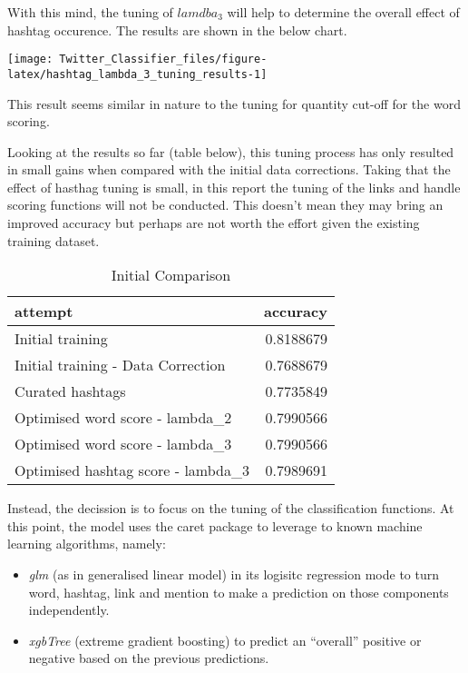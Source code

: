 \documentclass[11pt,]{article}
\providecommand{\tightlist}{%
  \setlength{\itemsep}{0pt}\setlength{\parskip}{0pt}}
\begin{document}
With this mind, the tuning of \(lamdba_3\) will help to determine the
overall effect of hashtag occurence. The results are shown in the below
chart.

\begin{center}\texttt{[image: Twitter\_Classifier\_files/figure-latex/hashtag\_lambda\_3\_tuning\_results-1]} \end{center}

This result seems similar in nature to the tuning for quantity cut-off
for the word scoring.

Looking at the results so far (table below), this tuning process has
only resulted in small gains when compared with the initial data
corrections. Taking that the effect of hasthag tuning is small, in this
report the tuning of the links and handle scoring functions will not be
conducted. This doesn't mean they may bring an improved accuracy but
perhaps are not worth the effort given the existing training dataset.

\begin{table}[H]

\caption{\label{tab:results_comparison_2}Initial Comparison}
\centering
\begin{tabular}[t]{lr}
\toprule
attempt & accuracy\\
\midrule
\rowcolor{gray!6}  Initial training & 0.8188679\\
Initial training - Data Correction & 0.7688679\\
\rowcolor{gray!6}  Curated hashtags & 0.7735849\\
Optimised word score - lambda\_2 & 0.7990566\\
\rowcolor{gray!6}  Optimised word score - lambda\_3 & 0.7990566\\
\addlinespace
Optimised hashtag score - lambda\_3 & 0.7989691\\
\bottomrule
\end{tabular}
\end{table}

Instead, the decission is to focus on the tuning of the classification
functions. At this point, the model uses the caret package to leverage
to known machine learning algorithms, namely:

\begin{itemize}
\tightlist
\item
  \emph{glm} (as in generalised linear model) in its logisitc regression
  mode to turn word, hashtag, link and mention to make a prediction on
  those components independently.
\item
  \emph{xgbTree} (extreme gradient boosting) to predict an ``overall''
  positive or negative based on the previous predictions.
\end{itemize}
\end{document}
